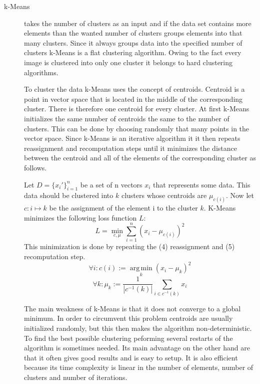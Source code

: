 \documentclass[journal]{vgtc}       %
\begin{document}
\begin{description}
\item [k-Means] takes the number of clusters as an input and if the data set contains more elements than the wanted number of clusters groups elements into that many clusters. Since it always groups data into the specified number of clusters k-Means is a flat clustering algorithm. Owing to the fact every image is clustered into only one cluster it belongs to hard clustering algorithms. 

To cluster the data k-Means uses the concept of centroids. Centroid is a point in vector space that is located in the middle of the corresponding cluster. There is therefore one centroid for every cluster. 
At first k-Means initializes the same number of centroids the same to the number of clusters. This can be done by choosing randomly that many points in the vector space. Since k-Means is an iterative algorithm it  it then repeats reassignment and recomputation steps until it minimizes the distance between the centroid and all of the elements of the corresponding cluster as follows. 

Let $D = \{x_i'\}_{i=1}^n$ be a set of n vectors $x_i$ that represents some data. This data should be clustered into $k$ clusters whose centroids are  $\mu_{c(i)}$. Now let $c: i \mapsto k$ be the assignment of the element i to the cluster $k$. 
K-Means minimizes the following loss function $L$:
\begin{equation}
L = \min_{c, \mu} \sum_{i=1}^{n}(x_i - \mu_{c(i)})^2
\end{equation} 
This minimization is done by repeating the (4) reassignment and (5) recomputation step.
\begin{equation}
\forall i: c(i) := \operatorname*{arg\,min}_k (x_i - \mu_k)^2
\end{equation}
\begin{equation}
\forall k: \mu_k := \frac{1}{|c^{-1}(k)|} \sum_{i \in c^{-1}(k)} x_i
\end{equation}


The main weakness of k-Means is that it does not converge to a global minimum. In order to circumvent this problem centroids are usually initialized randomly, but this then makes the algorithm non-deterministic. To find the best possible clustering peforming several restarts of the algorithm is sometimes needed.  Its main advantage on the other hand are that it often gives good results and is easy to setup. It is also efficient because its time complexity is linear in the number of elements, number of clusters and number of iterations.


\end{description}
\end{document}
